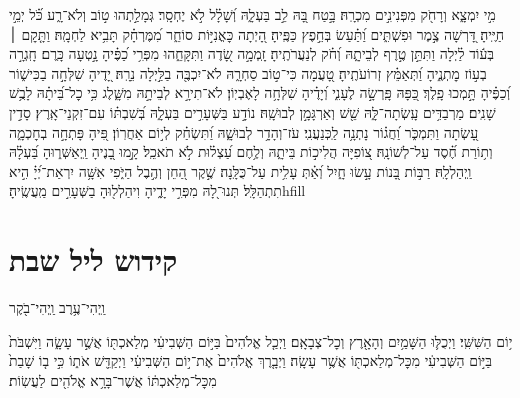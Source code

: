 \documentclass[twoside, openany, parskip=half, 11pt]{book}
\begin{document}
מִ֣י יִמְצָ֑א וְרָחֹ֖ק מִפְּנִינִ֣ים מִכְרָֽהּ׃ \hfill\break
בָּ֣טַח בָּ֭הּ לֵ֣ב בַּעְלָ֑הּ וְ֝שָׁלָ֗ל לֹ֣א יֶחְסָֽר׃ \hfill\break
גְּמָלַ֣תְהוּ ט֣וֹב וְלֹא־רָ֑ע כֹּ֗֝ל יְמֵ֣י חַיֶּֽיהָ׃ \hfill\break
דָּ֭רְשָׁה צֶ֣מֶר וּפִשְׁתִּ֑ים וַ֝תַּ֗עַשׂ בְּחֵ֣פֶץ כַּפֶּֽיהָ׃ \hfill\break
הָ֭יְתָה כׇּאֳנִיּ֣וֹת סוֹחֵ֑ר מִ֝מֶּרְחָ֗ק תָּבִ֥יא לַחְמָֽהּ׃ \hfill\break
וַתָּ֤קׇם ׀ בְּע֬וֹד לַ֗יְלָה וַתִּתֵּ֣ן טֶ֣רֶף לְבֵיתָ֑הּ וְ֝חֹ֗ק לְנַעֲרֹתֶֽיהָ׃ \hfill\break
זָֽמְמָ֣ה שָׂ֭דֶה וַתִּקָּחֵ֑הוּ מִפְּרִ֥י כַ֝פֶּ֗יהָ נָ֣טְעָה כָּֽרֶם׃ \hfill\break
חָֽגְרָ֣ה בְע֣וֹז מׇתְנֶ֑יהָ וַ֝תְּאַמֵּ֗ץ זְרוֹעֹתֶֽיהָ׃ \hfill\break
טָ֭עֲמָה כִּי־ט֣וֹב סַחְרָ֑הּ לֹא־יִכְבֶּ֖ה בַלַּ֣יְלָה נֵרָֽהּ׃ \hfill\break
יָ֭דֶיהָ שִׁלְּחָ֣ה בַכִּישׁ֑וֹר וְ֝כַפֶּ֗יהָ תָּ֣מְכוּ פָֽלֶךְ׃ \hfill\break
כַּ֭פָּהּ פָּֽרְשָׂ֣ה לֶעָנִ֑י וְ֝יָדֶ֗יהָ שִׁלְּחָ֥ה לָאֶבְיֽוֹן׃ \hfill\break
לֹא־תִירָ֣א לְבֵיתָ֣הּ מִשָּׁ֑לֶג כִּ֥י כׇל־בֵּ֝יתָ֗הּ לָבֻ֥שׁ שָׁנִֽים׃ \hfill\break
מַרְבַדִּ֥ים עָֽשְׂתָה־לָּ֑הּ שֵׁ֖שׁ וְאַרְגָּמָ֣ן לְבוּשָֽׁהּ׃ \hfill\break
נוֹדָ֣ע בַּשְּׁעָרִ֣ים בַּעְלָ֑הּ בְּ֝שִׁבְתּ֗וֹ עִם־זִקְנֵי־אָֽרֶץ׃ \hfill\break
סָדִ֣ין עָ֭שְׂתָה וַתִּמְכֹּ֑ר וַ֝חֲג֗וֹר נָתְנָ֥ה לַֽכְּנַעֲנִֽי׃ \hfill\break
עֹז־וְהָדָ֥ר לְבוּשָׁ֑הּ וַ֝תִּשְׂחַ֗ק לְי֣וֹם אַחֲרֽוֹן׃ \hfill\break
פִּ֭יהָ פָּתְחָ֣ה בְחׇכְמָ֑ה וְת֥וֹרַת חֶ֝֗סֶד עַל־לְשׁוֹנָֽהּ׃ \hfill\break
צ֭וֹפִיָּה הֲלִיכ֣וֹת בֵּיתָ֑הּ וְלֶ֥חֶם עַ֝צְל֗וּת לֹ֣א תֹאכֵֽל׃ \hfill\break
קָ֣מוּ בָ֭נֶיהָ וַֽיְאַשְּׁר֑וּהָ בַּ֝עְלָ֗הּ וַֽיְהַלְלָֽהּ׃ \hfill\break
רַבּ֣וֹת בָּ֭נוֹת עָ֣שׂוּ חָ֑יִל וְ֝אַ֗תְּ עָלִ֥ית עַל־כֻּלָּֽנָה׃ \hfill\break
שֶׁ֣קֶר הַ֭חֵן וְהֶ֣בֶל הַיֹּ֑פִי אִשָּׁ֥ה יִרְאַת־יְ֝יָ֗ הִ֣יא תִתְהַלָּֽל׃ \hfill\break
תְּנוּ־לָ֭הּ מִפְּרִ֣י יָדֶ֑יהָ וִיהַלְל֖וּהָ בַשְּׁעָרִ֣ים מַֽעֲשֶֽׂיהָ׃hfill \break


\section[קידוש ליל שבת]{ קידוש ליל שבת }

\newcommand{\savri}{\instruction{סַבְרִי מָרָנָן וְרְבָּנָן וְרַבּוֹתַי}\\}

\begin{footnotesize}וַֽיְהִי־עֶ֥רֶב וַֽיְהִי־בֹ֖קֶר\end{footnotesize}
י֥וֹם הַשִּׁשִּֽׁי׃ וַיְכֻלּ֛וּ הַשָּׁמַ֥יִם וְהָאָ֖רֶץ וְכׇל־צְבָאָֽם׃ וַיְכַ֤ל אֱלֹהִים֙ בַּיּ֣וֹם הַשְּׁבִיעִ֔י מְלַאכְתּ֖וֹ אֲשֶׁ֣ר עָשָׂ֑ה וַיִּשְׁבֹּת֙ בַּיּ֣וֹם הַשְּׁבִיעִ֔י מִכׇּל־מְלַאכְתּ֖וֹ אֲשֶׁ֥ר עָשָֽׂה׃ וַיְבָ֤רֶךְ אֱלֹהִים֙ אֶת־י֣וֹם הַשְּׁבִיעִ֔י וַיְקַדֵּ֖שׁ אֹת֑וֹ כִּ֣י ב֤וֹ שָׁבַת֙ מִכׇּל־מְלַאכְתּ֔וֹ אֲשֶׁר־בָּרָ֥א אֱלֹהִ֖ים לַעֲשֽׂוֹת׃
\end{document}
